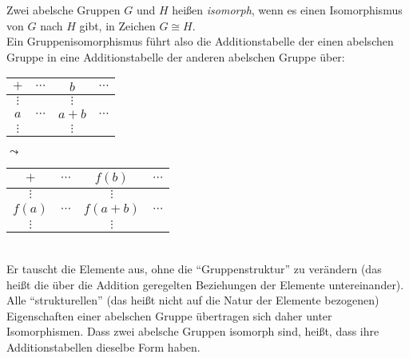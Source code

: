 \documentclass[../../main.tex]{subfiles}
\begin{document}
\begin{defbem}\label{2.2.15}
Zwei abelsche Gruppen $G$ und $H$ heißen \emph{isomorph}, wenn es einen Isomorphismus von $G$ nach $H$ gibt, in Zeichen $G\cong H$.\\
Ein Gruppenisomorphismus führt also die Additionstabelle der einen abelschen Gruppe in eine Additionstabelle der anderen abelschen Gruppe über:
\begin{table}[h!]
\centering
\begin{tabular}{c|ccc}
$+$ & $\cdots$ & $b$ & $\cdots$ \\\hline
$\vdots$ & & $\vdots$ &\\
$a$ & $\dotsm$ & $a+b$ & $\dotsm$ \\
$\vdots$ & & $\vdots$ &
\end{tabular}
\qquad$\leadsto$\qquad
\begin{tabular}{c|ccc}
$+$ & $\cdots$ & $f(b)$ & $\cdots$\\\hline
$\vdots$ & & $\vdots$ &\\
$f(a)$ & $\dotsm$ &$f(a+b)$ & $\dotsm$ \\
$\vdots$ & & $\vdots$ &
\end{tabular}
\end{table}\\
Er tauscht die Elemente aus, ohne die "`Gruppenstruktur"' zu verändern
(das heißt die über die Addition geregelten Beziehungen der Elemente untereinander). Alle "`strukturellen"' (das heißt
nicht auf die Natur der Elemente bezogenen) Eigenschaften einer abelschen Gruppe übertragen sich daher unter Isomorphismen. Dass zwei abelsche Gruppen isomorph sind, heißt, dass ihre Additionstabellen dieselbe Form haben.
\end{defbem}
\end{document}

